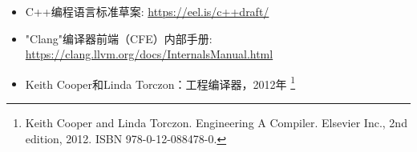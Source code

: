 \begin{itemize}
\item
C++编程语言标准草案: \url{https://eel.is/c++draft/}

\item
"Clang"编译器前端（CFE）内部手册: \url{https://clang.llvm.org/docs/InternalsManual.html}

\item
Keith Cooper和Linda Torczon：工程编译器，2012年 \footnote{Keith Cooper and Linda Torczon. Engineering A Compiler. Elsevier Inc., 2nd edition, 2012. ISBN 978-0-12-088478-0.}
\end{itemize}

